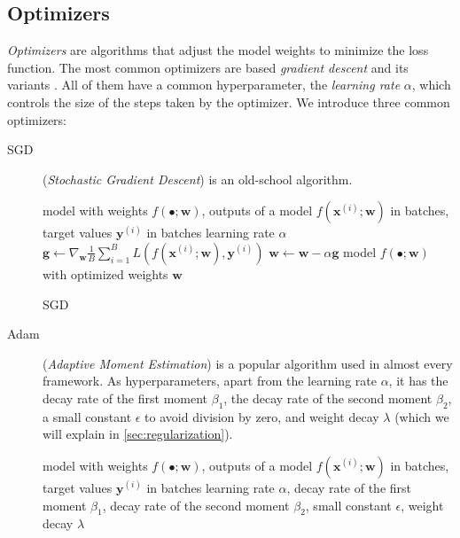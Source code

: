 \subsection{Optimizers}
\label{sec:optimizers}
\emph{Optimizers} are algorithms that adjust the model weights to minimize the loss function.
The most common optimizers are based \emph{gradient descent} and its variants \cite{optimization}.
All of them have a common hyperparameter, the \emph{learning rate} $\alpha$, which controls the size of the steps taken by the optimizer.
We introduce three common optimizers: 
\begin{description}
    \item[SGD] (\emph{Stochastic Gradient Descent}) \cite{deeplearningbook} is an old-school \ml algorithm.
    \begin{algorithm}
        \begin{algorithmic}
        \Require model with weights $f(\bullet;\pmb{w})$, outputs of a model $f(\pmb{x}^{(i)};\pmb{w})$ in batches, target values $\pmb{y}^{(i)}$ in batches
        \Require learning rate $\alpha$
            \State $\pmb{g} \gets \nabla_{\pmb{w}} \frac1B \sum_{i=1}^B L(f(\pmb{x}^{(i)};\pmb{w}),\pmb{y}^{(i)})$
            \State $\pmb{w} \gets \pmb{w} - \alpha \pmb{g}$
        \EndFor
        \Ensure model $f(\bullet;\pmb{w})$ with optimized weights $\pmb{w}$
        \end{algorithmic}
        \caption{SGD}
        \label{alg:sgd}
    \end{algorithm}
    \item[Adam] (\emph{Adaptive Moment Estimation}) \cite{adam} is a popular \dl algorithm used in almost every \dl framework.
    As hyperparameters, apart from the learning rate $\alpha$, it has the decay rate of the first moment $\beta_1$, the decay rate of the second moment $\beta_2$, a small constant $\epsilon$ to avoid division by zero, and weight decay $\lambda$ (which we will explain in \cref{sec:regularization}).
    \begin{algorithm}
        \begin{algorithmic}[1]
        \Require model with weights $f(\bullet;\pmb{w})$, outputs of a model $f(\pmb{x}^{(i)};\pmb{w})$ in batches, target values $\pmb{y}^{(i)}$ in batches
        \Require learning rate $\alpha$, decay rate of the first moment $\beta_1$, decay rate of the second moment $\beta_2$, small constant $\epsilon$, weight decay $\lambda$

\end{algorithmic}
\end{algorithm}
\end{description}
